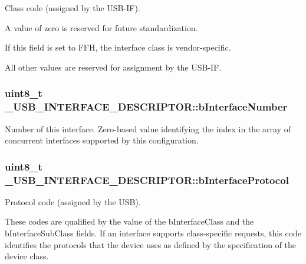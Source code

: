 Class code (assigned by the U\-S\-B-\/\-I\-F). \par
A value of zero is reserved for future standardization. \par
If this field is set to F\-F\-H, the interface class is vendor-\/specific. \par
All other values are reserved for assignment by the U\-S\-B-\/\-I\-F. \hypertarget{struct__USB__INTERFACE__DESCRIPTOR_a1cd05be188c8776aaa33029e0e7e8c32}{
\subsubsection[{b\-Interface\-Number}]{\setlength{\rightskip}{0pt plus 5cm}uint8\-\_\-t \-\_\-\-U\-S\-B\-\_\-\-I\-N\-T\-E\-R\-F\-A\-C\-E\-\_\-\-D\-E\-S\-C\-R\-I\-P\-T\-O\-R\-::b\-Interface\-Number}}\label{struct__USB__INTERFACE__DESCRIPTOR_a1cd05be188c8776aaa33029e0e7e8c32}
Number of this interface. Zero-\/based value identifying the index in the array of concurrent interfaces supported by this configuration. \hypertarget{struct__USB__INTERFACE__DESCRIPTOR_a12f09e3be7c323bbd776f75af515ec7f}{
\subsubsection[{b\-Interface\-Protocol}]{\setlength{\rightskip}{0pt plus 5cm}uint8\-\_\-t \-\_\-\-U\-S\-B\-\_\-\-I\-N\-T\-E\-R\-F\-A\-C\-E\-\_\-\-D\-E\-S\-C\-R\-I\-P\-T\-O\-R\-::b\-Interface\-Protocol}}\label{struct__USB__INTERFACE__DESCRIPTOR_a12f09e3be7c323bbd776f75af515ec7f}
Protocol code (assigned by the U\-S\-B). \par
These codes are qualified by the value of the b\-Interface\-Class and the b\-Interface\-Sub\-Class fields. If an interface supports class-\/specific requests, this code identifies the protocols that the device uses as defined by the specification of the device class. \par
